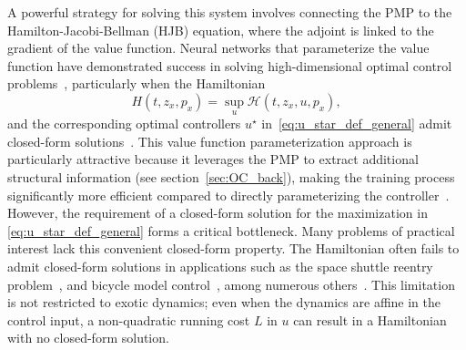 \documentclass[letterpaper, 10 pt, conference]{ieeeconf}  %
\begin{document}
    A powerful strategy for solving this system involves connecting the PMP to the Hamilton-Jacobi-Bellman (HJB) equation, where the adjoint is linked to the gradient of the value function. Neural networks that parameterize the value function have demonstrated success in solving high-dimensional optimal control problems~\cite{onken2022neural, onken2021neural, lin2021alternating}, particularly when the Hamiltonian
    \begin{equation}
        H(t,z_{x},p_{x}) = \sup_u \mathcal{H}(t,z_{x},u,p_{x}),
        \label{eq:straight_H}
    \end{equation}
    and the corresponding optimal controllers $u^\star$ in~\eqref{eq:u_star_def_general} admit closed-form solutions~\cite{onken2022neural, onken2021neural, nakamura2021adaptive, zhao2024offline,Verma-HJB-RL}. This value function parameterization approach is particularly attractive because it leverages the PMP to extract additional structural information (see section~\ref{sec:OC_back}), making the training process significantly more efficient compared to  directly parameterizing the controller~\cite{onken2022neural, onken2021neural, li2024neural}.
    However, the requirement of a closed-form solution for the maximization in \eqref{eq:u_star_def_general} forms a critical bottleneck. Many problems of practical interest lack this convenient closed-form property. The Hamiltonian often fails to admit closed-form solutions in applications such as the space shuttle reentry problem~\cite[Example 4.1]{betts2010practical}, 
    and bicycle model control~\cite{xiao2023safe}, among numerous others~\cite{betts2010practical, dickmanns1972maximum, ge2007neural, ge1999adaptive, ge2003neural, ge2002adaptive, wang2006iss, calise2001adaptive}. This limitation is not restricted to exotic dynamics; even when the dynamics are affine in the control input, a non-quadratic running cost $L$ in $u$ can result in a Hamiltonian with no closed-form solution.
    
\end{document}
